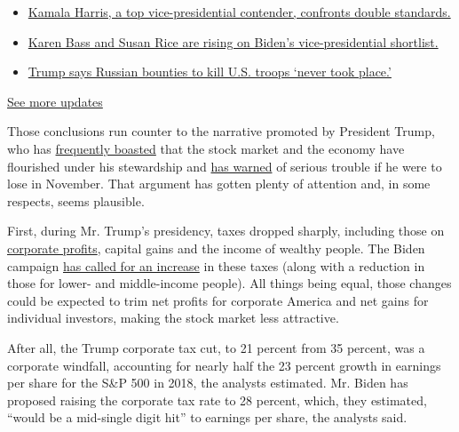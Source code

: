 \begin{itemize}
\tightlist
\item
  \href{https://www.nytimes.com/2020/07/31/us/elections/biden-vs-trump.html?action=click\&pgtype=Article\&state=default\&region=MAIN_CONTENT_1\&context=storylines_live_updates\#link-29fdff45}{Kamala
  Harris, a top vice-presidential contender, confronts double
  standards.}
\item
  \href{https://www.nytimes.com/2020/07/31/us/elections/biden-vs-trump.html?action=click\&pgtype=Article\&state=default\&region=MAIN_CONTENT_1\&context=storylines_live_updates\#link-13ec3d9c}{Karen
  Bass and Susan Rice are rising on Biden's vice-presidential
  shortlist.}
\item
  \href{https://www.nytimes.com/2020/07/31/us/elections/biden-vs-trump.html?action=click\&pgtype=Article\&state=default\&region=MAIN_CONTENT_1\&context=storylines_live_updates\#link-49e9a016}{Trump
  says Russian bounties to kill U.S. troops `never took place.'}
\end{itemize}

\href{https://www.nytimes.com/2020/07/31/us/elections/biden-vs-trump.html?action=click\&pgtype=Article\&state=default\&region=MAIN_CONTENT_1\&context=storylines_live_updates}{See
more updates}

Those conclusions run counter to the narrative promoted by President
Trump, who has
\href{https://www.whitehouse.gov/briefings-statements/remarks-president-trump-jobs-numbers-report-2/}{frequently
boasted} that the stock market and the economy have flourished under his
stewardship and
\href{https://www.cnn.com/2020/07/08/investing/biden-trump-stock-market-election/index.html}{has
warned} of serious trouble if he were to lose in November. That argument
has gotten plenty of attention and, in some respects, seems plausible.

First, during Mr. Trump's presidency, taxes dropped sharply, including
those on
\href{https://www.nytimes.com/2018/12/27/us/politics/trump-tax-cuts-jobs-act.html}{corporate
profits}, capital gains and the income of wealthy people. The Biden
campaign
\href{https://www.nytimes.com/2020/03/04/business/2020-democrats-tax.html}{has
called for an increase} in these taxes (along with a reduction in those
for lower- and middle-income people). All things being equal, those
changes could be expected to trim net profits for corporate America and
net gains for individual investors, making the stock market less
attractive.

After all, the Trump corporate tax cut, to 21 percent from 35 percent,
was a corporate windfall, accounting for nearly half the 23 percent
growth in earnings per share for the S\&P 500 in 2018, the analysts
estimated. Mr. Biden has proposed raising the corporate tax rate to 28
percent, which, they estimated, ``would be a mid-single digit hit'' to
earnings per share, the analysts said.

